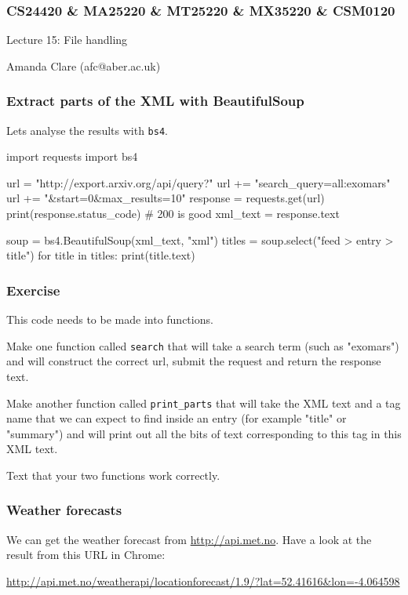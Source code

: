 \documentclass{beamer}
\begin{document}

\begin{frame}
\frametitle{CS24420 \& MA25220 \& MT25220 \& MX35220 \& CSM0120}

\begin{center}
\begin{huge}
Lecture 15: File handling 
\end{huge}
\bigskip

Amanda Clare (afc@aber.ac.uk)

\end{center}
\end{frame}


\begin{frame}[fragile]
\frametitle{Extract parts of the XML with BeautifulSoup}
Lets analyse the results with \texttt{bs4}.
\begin{code}
import requests
import bs4

url = "http://export.arxiv.org/api/query?" 
url += "search_query=all:exomars" 
url += "&start=0&max_results=10"
response = requests.get(url)
print(response.status_code) # 200 is good
xml_text = response.text

soup = bs4.BeautifulSoup(xml_text, "xml")
titles = soup.select("feed > entry > title")
for title in titles:
   print(title.text)
\end{code}
\end{frame}

\begin{frame}[fragile]
\frametitle{Exercise}
This code needs to be made into functions. 

\bigskip

Make one function called \texttt{search} that will take a search term (such as "exomars") and will construct the correct url, submit the request and return the response text.

\bigskip

Make another function called \texttt{print\_parts} that will take the XML text and a tag name that we can expect to find inside an entry (for example "title" or "summary") and will print out all the bits of text corresponding to this tag in this XML text.

\bigskip

Text that your two functions work correctly.
\end{frame}

\begin{frame}[fragile]
\frametitle{Weather forecasts}
We can get the weather forecast from \url{http://api.met.no}. Have a look at the result from this URL in Chrome:

\bigskip

\url{http://api.met.no/weatherapi/locationforecast/1.9/?lat=52.41616&lon=-4.064598}
\end{frame}
\end{document}
